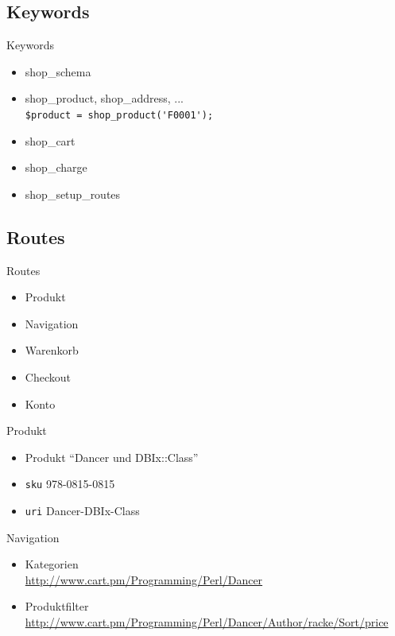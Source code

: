\subsection{Keywords}
\begin{frame}[fragile]{Keywords}
\begin{itemize}
\item shop\_schema
\item shop\_product, shop\_address, ...\\
\verb|$product = shop_product('F0001');|
\item shop\_cart
\item shop\_charge
\item shop\_setup\_routes
\end{itemize}
\end{frame}

\subsection{Routes}
\begin{frame}{Routes}
\begin{itemize}
\item Produkt
\item Navigation
\item Warenkorb
\item Checkout
\item Konto
\end{itemize}
\end{frame}

\begin{frame}[fragile]{Produkt}
\begin{itemize}
\item Produkt ``Dancer und DBIx::Class''\\
\item \verb|sku| 978-0815-0815 \\
\item \verb|uri| Dancer-DBIx-Class
\end{itemize}
\end{frame}

\begin{frame}{Navigation}
\begin{itemize}
\item Kategorien \\
\url{http://www.cart.pm/Programming/Perl/Dancer}
\item Produktfilter \\
\url{http://www.cart.pm/Programming/Perl/Dancer/Author/racke/Sort/price}
\end{itemize}
\end{frame}

